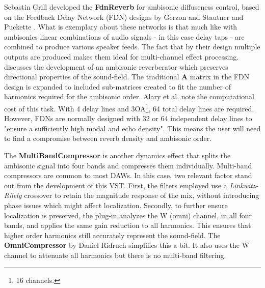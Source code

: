 Sebastin Grill developed the \textbf{FdnReverb} for ambisonic diffuseness control, based on the Feedback Delay Network (FDN) designs by Gerzon \cite{gerzon1976unitary} and Stautner and Puckette \cite{stautner1982designing}. What is exemplary about these networks is that much like with ambisonics linear combinations of audio signals - in this case delay taps - are combined to produce various speaker feeds. The fact that by their design multiple outputs are produced makes them ideal for multi-channel effect processing. \cite{alary2019directional} discusses the development of an ambisonic reverberator which preserves directional properties of the sound-field. The traditional $\mathbf{A}$ matrix in the FDN design is expanded to included sub-matrices created to fit the number of harmonics required for the ambisonic order. Alary et al. \cite{alary2019directional} note the computational cost of this task. With 4 delay lines and 3OA\footnote{16 channels.}, 64 total delay lines are required. However, FDNs are normally designed with 32 or 64 independent delay lines to "ensure a sufficiently high modal and echo density". This means the user will need to find a compromise between reverb density and ambisonic order.


The \textbf{MultiBandCompressor} is another dynamics effect that splits the ambisonic signal into four bands and compresses them individually. Multi-band compressors are common to most DAWs. In this case, two relevant factor stand out from the development of this VST. First, the filters employed use a \textit{Linkwitz-Rilely} crossover to retain the magnitude response of the mix, without introducing phase issues which might affect localization. Secondly, to further ensure localization is preserved, the plug-in analyzes the W (omni) channel, in all four bands, and applies the same gain reduction to all harmonics. This ensures that higher order harmonics still accurately represent the sound-field. The \textbf{OmniCompressor} by Daniel Ridruch simplifies this a bit. It also uses the W channel to attenuate all harmonics but there is no multi-band filtering. 





